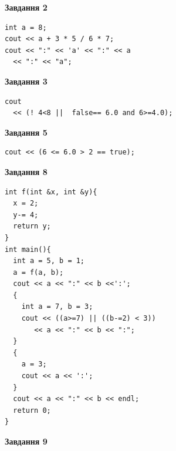 \documentclass[12pt, ukrainian]{article}
\begin{document}
{\begin {large}
\begin{minipage}[t]{7.0cm}
\end{minipage}
\vline \hspace{1mm}
\begin{minipage}[t]{11.0cm}

\begin{center}
\textbf{Завдання 2}
\end{center}
\vspace{-8mm}

\begin{verbatim}
int a = 8;
cout << a + 3 * 5 / 6 * 7;
cout << ":" << 'a' << ":" << a 
  << ":" << "a";
\end{verbatim}



\begin{center}
\textbf{Завдання 3}
\end{center}
\vspace{-8mm}

\begin{verbatim}
cout 
  << (! 4<8 ||  false== 6.0 and 6>=4.0);
\end{verbatim}



\begin{center}
\textbf{Завдання 5}
\end{center}
\vspace{-8mm}

\begin{verbatim}
cout << (6 <= 6.0 > 2 == true);
\end{verbatim}



\begin{center}
\textbf{Завдання 8}
\end{center}
\vspace{-8mm}

\begin{verbatim}
int f(int &x, int &y){
  x = 2;
  y-= 4;
  return y;
}
int main(){
  int a = 5, b = 1;
  a = f(a, b);
  cout << a << ":" << b <<':';
  {
    int a = 7, b = 3;
    cout << ((a>=7) || ((b-=2) < 3))
       << a << ":" << b << ":";
  }
  {
    a = 3;
    cout << a << ':';
  }
  cout << a << ":" << b << endl;
  return 0;
}
\end{verbatim}

\end{minipage}


\begin{minipage}[t]{7.0cm}

\begin{center}
\textbf{Завдання 9}
\end{center}
\vspace{-8mm}


\end{minipage}
\end{large}}
\end{document}
